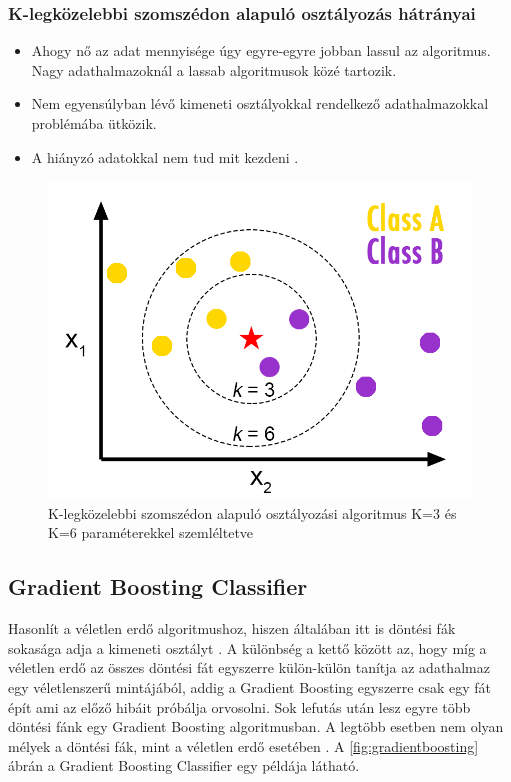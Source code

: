 \subsubsection{K-legközelebbi szomszédon alapuló osztályozás hátrányai}
\begin{itemize}
    \item Ahogy nő az adat mennyisége úgy egyre-egyre jobban lassul az algoritmus. Nagy adathalmazoknál a lassab algoritmusok közé tartozik.
    \item Nem egyensúlyban lévő kimeneti osztályokkal rendelkező adathalmazokkal problémába ütközik.
    \item A hiányzó adatokkal nem tud mit kezdeni \cite{k_legkozelebbi_1}.
\end{itemize}


\begin{figure}[h]
    \centering
    \includegraphics[scale=0.4]{images/3.fejezet/KNearestNeighbours.png}
    \caption{K-legközelebbi szomszédon alapuló osztályozási algoritmus K=3 és K=6 paraméterekkel szemléltetve \cite{klegkozelebbi_abra}}
    \label{fig:klegkozelebbi}
\end{figure}

\subsection{Gradient Boosting Classifier}
Hasonlít a véletlen erdő algoritmushoz, hiszen általában itt is döntési fák sokasága adja a kimeneti osztályt \cite{gradient_boosting_1}. A különbség a kettő között az, hogy míg a véletlen erdő az összes döntési fát egyszerre külön-külön tanítja az adathalmaz egy véletlenszerű mintájából, addig a Gradient Boosting egyszerre csak egy fát épít ami az előző hibáit próbálja orvosolni. Sok lefutás után lesz egyre több döntési fánk egy Gradient Boosting algoritmusban. A legtöbb esetben nem olyan mélyek a döntési fák, mint a véletlen erdő esetében \cite{gradient_boosting_2}. A \ref{fig:gradientboosting} ábrán a Gradient Boosting Classifier egy példája látható.

